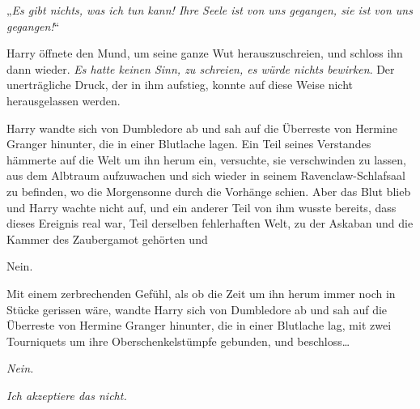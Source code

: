 „\emph{Es gibt nichts, was ich tun kann! Ihre Seele ist von uns gegangen, sie ist von uns gegangen!}“

Harry öffnete den Mund, um seine ganze Wut herauszuschreien, und schloss ihn dann wieder. \emph{Es hatte keinen Sinn, zu schreien, es würde nichts bewirken}. Der unerträgliche Druck, der in ihm aufstieg, konnte auf diese Weise nicht herausgelassen werden.

Harry wandte sich von Dumbledore ab und sah auf die Überreste von Hermine Granger hinunter, die in einer Blutlache lagen. Ein Teil seines Verstandes hämmerte auf die Welt um ihn herum ein, versuchte, sie verschwinden zu lassen, aus dem Albtraum aufzuwachen und sich wieder in seinem Ravenclaw-Schlafsaal zu befinden, wo die Morgensonne durch die Vorhänge schien. Aber das Blut blieb und Harry wachte nicht auf, und ein anderer Teil von ihm wusste bereits, dass dieses Ereignis real war, Teil derselben fehlerhaften Welt, zu der Askaban und die Kammer des Zaubergamot gehörten und

Nein.

Mit einem zerbrechenden Gefühl, als ob die Zeit um ihn herum immer noch in Stücke gerissen wäre, wandte Harry sich von Dumbledore ab und sah auf die Überreste von Hermine Granger hinunter, die in einer Blutlache lag, mit zwei Tourniquets um ihre Oberschenkelstümpfe gebunden, und beschloss…

\emph{Nein.}

\emph{Ich akzeptiere das nicht.}

